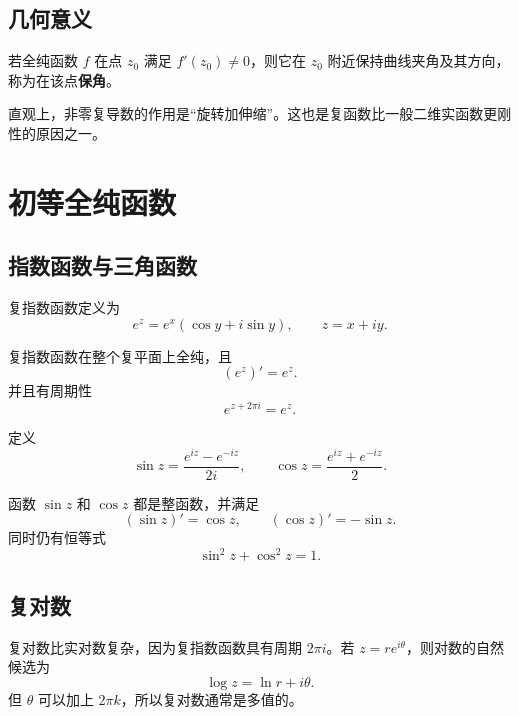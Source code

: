\subsection{几何意义}

\begin{definition}[保角映射]
若全纯函数 $f$ 在点 $z_0$ 满足 $f'(z_0)\ne0$，则它在 $z_0$ 附近保持曲线夹角及其方向，称为在该点\textbf{保角}。
\end{definition}

直观上，非零复导数的作用是“旋转加伸缩”。这也是复函数比一般二维实函数更刚性的原因之一。

\section{初等全纯函数}

\subsection{指数函数与三角函数}

\begin{definition}[复指数函数]
复指数函数定义为
\[
    e^z=e^x(\cos y+i\sin y),
    \qquad z=x+iy.
\]
\end{definition}

\begin{proposition}
复指数函数在整个复平面上全纯，且
\[
    (e^z)'=e^z.
\]
并且有周期性
\[
    e^{z+2\pi i}=e^z.
\]
\end{proposition}

\begin{definition}[复正弦与复余弦]
定义
\[
    \sin z=\frac{e^{iz}-e^{-iz}}{2i},
    \qquad
    \cos z=\frac{e^{iz}+e^{-iz}}{2}.
\]
\end{definition}

\begin{proposition}
函数 $\sin z$ 和 $\cos z$ 都是整函数，并满足
\[
    (\sin z)'=\cos z,
    \qquad
    (\cos z)'=-\sin z.
\]
同时仍有恒等式
\[
    \sin^2 z+\cos^2 z=1.
\]
\end{proposition}

\subsection{复对数}

复对数比实对数复杂，因为复指数函数具有周期 $2\pi i$。若 $z=re^{i\theta}$，则对数的自然候选为
\[
    \log z=\ln r+i\theta.
\]
但 $\theta$ 可以加上 $2\pi k$，所以复对数通常是多值的。

